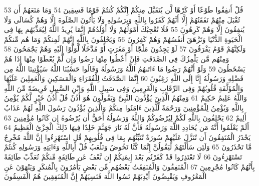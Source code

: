 \documentclass[20pt,a4paper]{article}
\begin{document}
{\tiny\colorbox{cl_aya}{53}} قُلْ أَنفِقُوا طَوْعًا أَوْ كَرْهًا لَّن يُتَقَبَّلَ مِنكُمْ إِنَّكُمْ كُنتُمْ قَوْمًا فَسِقِينَ
{\tiny\colorbox{cl_aya}{54}} وَمَا مَنَعَهُمْ أَن تُقْبَلَ مِنْهُمْ نَفَقَتُهُمْ إِلَّا أَنَّهُمْ كَفَرُوا بِاللَّهِ وَبِرَسُولِهِ وَلَا يَأْتُونَ الصَّلَوةَ إِلَّا وَهُمْ كُسَالَى وَلَا يُنفِقُونَ إِلَّا وَهُمْ كَرِهُونَ
{\tiny\colorbox{cl_aya}{55}} فَلَا تُعْجِبْكَ أَمْوَلُهُمْ وَلَا أَوْلَدُهُمْ إِنَّمَا يُرِيدُ اللَّهُ لِيُعَذِّبَهُم بِهَا فِى الْحَيَوةِ الدُّنْيَا وَتَزْهَقَ أَنفُسُهُمْ وَهُمْ كَفِرُونَ
{\tiny\colorbox{cl_aya}{56}} وَيَحْلِفُونَ بِاللَّهِ إِنَّهُمْ لَمِنكُمْ وَمَا هُم مِّنكُمْ وَلَكِنَّهُمْ قَوْمٌ يَفْرَقُونَ
{\tiny\colorbox{cl_aya}{57}} لَوْ يَجِدُونَ مَلْجًَٔا أَوْ مَغَرَتٍ أَوْ مُدَّخَلًا لَّوَلَّوْا إِلَيْهِ وَهُمْ يَجْمَحُونَ
{\tiny\colorbox{cl_aya}{58}} وَمِنْهُم مَّن يَلْمِزُكَ فِى الصَّدَقَتِ فَإِنْ أُعْطُوا مِنْهَا رَضُوا وَإِن لَّمْ يُعْطَوْا مِنْهَا إِذَا هُمْ يَسْخَطُونَ
{\tiny\colorbox{cl_aya}{59}} وَلَوْ أَنَّهُمْ رَضُوا مَا ءَاتَىهُمُ اللَّهُ وَرَسُولُهُ وَقَالُوا حَسْبُنَا اللَّهُ سَيُؤْتِينَا اللَّهُ مِن فَضْلِهِ وَرَسُولُهُ إِنَّا إِلَى اللَّهِ رَغِبُونَ
{\tiny\colorbox{cl_aya}{60}} إِنَّمَا الصَّدَقَتُ لِلْفُقَرَاءِ وَالْمَسَكِينِ وَالْعَمِلِينَ عَلَيْهَا وَالْمُؤَلَّفَةِ قُلُوبُهُمْ وَفِى الرِّقَابِ وَالْغَرِمِينَ وَفِى سَبِيلِ اللَّهِ وَابْنِ السَّبِيلِ فَرِيضَةً مِّنَ اللَّهِ وَاللَّهُ عَلِيمٌ حَكِيمٌ
{\tiny\colorbox{cl_aya}{61}} وَمِنْهُمُ الَّذِينَ يُؤْذُونَ النَّبِىَّ وَيَقُولُونَ هُوَ أُذُنٌ قُلْ أُذُنُ خَيْرٍ لَّكُمْ يُؤْمِنُ بِاللَّهِ وَيُؤْمِنُ لِلْمُؤْمِنِينَ وَرَحْمَةٌ لِّلَّذِينَ ءَامَنُوا مِنكُمْ وَالَّذِينَ يُؤْذُونَ رَسُولَ اللَّهِ لَهُمْ عَذَابٌ أَلِيمٌ
{\tiny\colorbox{cl_aya}{62}} يَحْلِفُونَ بِاللَّهِ لَكُمْ لِيُرْضُوكُمْ وَاللَّهُ وَرَسُولُهُ أَحَقُّ أَن يُرْضُوهُ إِن كَانُوا مُؤْمِنِينَ
{\tiny\colorbox{cl_aya}{63}} أَلَمْ يَعْلَمُوا أَنَّهُ مَن يُحَادِدِ اللَّهَ وَرَسُولَهُ فَأَنَّ لَهُ نَارَ جَهَنَّمَ خَلِدًا فِيهَا ذَلِكَ الْخِزْىُ الْعَظِيمُ
{\tiny\colorbox{cl_aya}{64}} يَحْذَرُ الْمُنَفِقُونَ أَن تُنَزَّلَ عَلَيْهِمْ سُورَةٌ تُنَبِّئُهُم بِمَا فِى قُلُوبِهِمْ قُلِ اسْتَهْزِءُوا إِنَّ اللَّهَ مُخْرِجٌ مَّا تَحْذَرُونَ
{\tiny\colorbox{cl_aya}{65}} وَلَئِن سَأَلْتَهُمْ لَيَقُولُنَّ إِنَّمَا كُنَّا نَخُوضُ وَنَلْعَبُ قُلْ أَبِاللَّهِ وَءَايَتِهِ وَرَسُولِهِ كُنتُمْ تَسْتَهْزِءُونَ
{\tiny\colorbox{cl_aya}{66}} لَا تَعْتَذِرُوا قَدْ كَفَرْتُم بَعْدَ إِيمَنِكُمْ إِن نَّعْفُ عَن طَائِفَةٍ مِّنكُمْ نُعَذِّبْ طَائِفَةً بِأَنَّهُمْ كَانُوا مُجْرِمِينَ
{\tiny\colorbox{cl_aya}{67}} الْمُنَفِقُونَ وَالْمُنَفِقَتُ بَعْضُهُم مِّن بَعْضٍ يَأْمُرُونَ بِالْمُنكَرِ وَيَنْهَوْنَ عَنِ الْمَعْرُوفِ وَيَقْبِضُونَ أَيْدِيَهُمْ نَسُوا اللَّهَ فَنَسِيَهُمْ إِنَّ الْمُنَفِقِينَ هُمُ الْفَسِقُونَ
\end{document}
